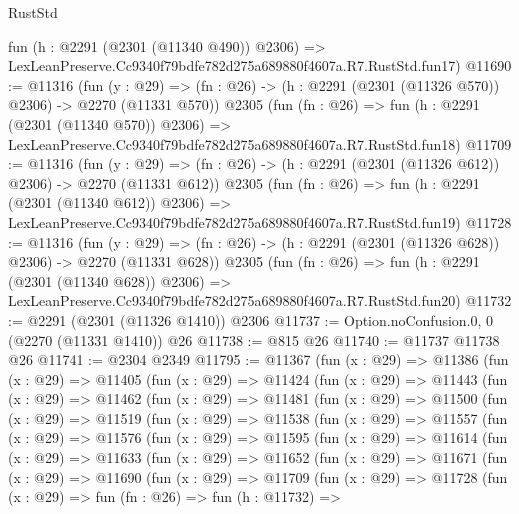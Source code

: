 \begin{lexlean}{RustStd}
\begin{coremodule}
    fun (h : @2291 (@2301 (@11340 @490)) @2306) =>
    LexLeanPreserve.Cc9340f79bdfe782d275a689880f4607a.R7.RustStd.fun17)
@11690 := @11316
    (fun (y : @29) => (fn : @26) -> (h : @2291 (@2301 (@11326 @570)) @2306) -> @2270 (@11331 @570))
    @2305
    (fun (fn : @26) =>
    fun (h : @2291 (@2301 (@11340 @570)) @2306) =>
    LexLeanPreserve.Cc9340f79bdfe782d275a689880f4607a.R7.RustStd.fun18)
@11709 := @11316
    (fun (y : @29) => (fn : @26) -> (h : @2291 (@2301 (@11326 @612)) @2306) -> @2270 (@11331 @612))
    @2305
    (fun (fn : @26) =>
    fun (h : @2291 (@2301 (@11340 @612)) @2306) =>
    LexLeanPreserve.Cc9340f79bdfe782d275a689880f4607a.R7.RustStd.fun19)
@11728 := @11316
    (fun (y : @29) => (fn : @26) -> (h : @2291 (@2301 (@11326 @628)) @2306) -> @2270 (@11331 @628))
    @2305
    (fun (fn : @26) =>
    fun (h : @2291 (@2301 (@11340 @628)) @2306) =>
    LexLeanPreserve.Cc9340f79bdfe782d275a689880f4607a.R7.RustStd.fun20)
@11732 := @2291 (@2301 (@11326 @1410)) @2306
@11737 := Option.noConfusion.{0, 0} (@2270 (@11331 @1410)) @26
@11738 := @815 @26
@11740 := @11737 @11738 @26
@11741 := @2304 @2349
@11795 := @11367
    (fun (x : @29) =>
    @11386
      (fun (x : @29) =>
      @11405
        (fun (x : @29) =>
        @11424
          (fun (x : @29) =>
          @11443
            (fun (x : @29) =>
            @11462
              (fun (x : @29) =>
              @11481
                (fun (x : @29) =>
                @11500
                  (fun (x : @29) =>
                  @11519
                    (fun (x : @29) =>
                    @11538
                      (fun (x : @29) =>
                      @11557
                        (fun (x : @29) =>
                        @11576
                          (fun (x : @29) =>
                          @11595
                            (fun (x : @29) =>
                            @11614
                              (fun (x : @29) =>
                              @11633
                                (fun (x : @29) =>
                                @11652
                                  (fun (x : @29) =>
                                  @11671
                                    (fun (x : @29) =>
                                    @11690
                                      (fun (x : @29) =>
                                      @11709
                                        (fun (x : @29) =>
                                        @11728
                                          (fun (x : @29) =>
                                          fun (fn : @26) =>
                                          fun (h : @11732) =>

\end{coremodule}
\end{lexlean}

